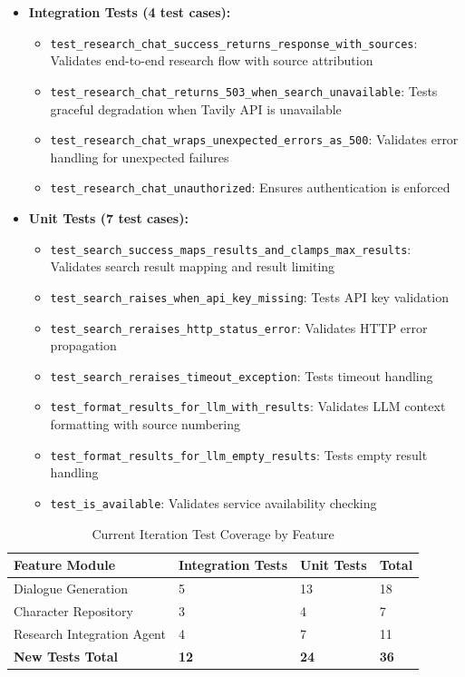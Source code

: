 \begin{itemize}
    \item \textbf{Integration Tests (4 test cases):}
    \begin{itemize}
        \item \texttt{test\_research\_chat\_success\_returns\_response\_with\_sources}: Validates end-to-end research flow with source attribution
        \item \texttt{test\_research\_chat\_returns\_503\_when\_search\_unavailable}: Tests graceful degradation when Tavily API is unavailable
        \item \texttt{test\_research\_chat\_wraps\_unexpected\_errors\_as\_500}: Validates error handling for unexpected failures
        \item \texttt{test\_research\_chat\_unauthorized}: Ensures authentication is enforced
    \end{itemize}
    \item \textbf{Unit Tests (7 test cases):}
    \begin{itemize}
        \item \texttt{test\_search\_success\_maps\_results\_and\_clamps\_max\_results}: Validates search result mapping and result limiting
        \item \texttt{test\_search\_raises\_when\_api\_key\_missing}: Tests API key validation
        \item \texttt{test\_search\_reraises\_http\_status\_error}: Validates HTTP error propagation
        \item \texttt{test\_search\_reraises\_timeout\_exception}: Tests timeout handling
        \item \texttt{test\_format\_results\_for\_llm\_with\_results}: Validates LLM context formatting with source numbering
        \item \texttt{test\_format\_results\_for\_llm\_empty\_results}: Tests empty result handling
        \item \texttt{test\_is\_available}: Validates service availability checking
    \end{itemize}
\end{itemize}

\begin{table}[H]
\centering
\small
\begin{tabular}{|p{4.5cm}|p{2cm}|p{2cm}|p{2cm}|}
\hline
\textbf{Feature Module} & \textbf{Integration Tests} & \textbf{Unit Tests} & \textbf{Total} \\ \hline
Dialogue Generation & 5 & 13 & 18 \\ \hline
Character Repository & 3 & 4 & 7 \\ \hline
Research Integration Agent & 4 & 7 & 11 \\ \hline
\textbf{New Tests Total} & \textbf{12} & \textbf{24} & \textbf{36} \\ \hline
\end{tabular}
\caption{Current Iteration Test Coverage by Feature}
\end{table}

